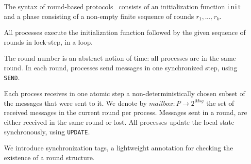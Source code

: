 The syntax of round-based protocols \Psync\ consists of an initialization function \texttt{init} and a phase consisting of a non-empty finite sequence of rounds $r_1, ..., r_k$. 

All processes execute the initialization function followed by the given sequence of rounds in lock-step, in a loop. 

The round number is an abstract notion of time: all processes are in the same round. In each round, processes send messages in one synchronized step, using \texttt{SEND}. 

Each process receives in one atomic step a non-deterministically chosen subset of the messages that were sent to it. We denote by $\mathit{mailbox} : P \rightarrow 2^{\mathit{Msg}}$ the set of received messages in the current round per process.
Messages sent in a round, are either received in the same round or lost. 
All processes update the local state synchronously, using \texttt{UPDATE}.  

We introduce synchronization tags, a lightweight annotation for checking the existence of a round structure.



